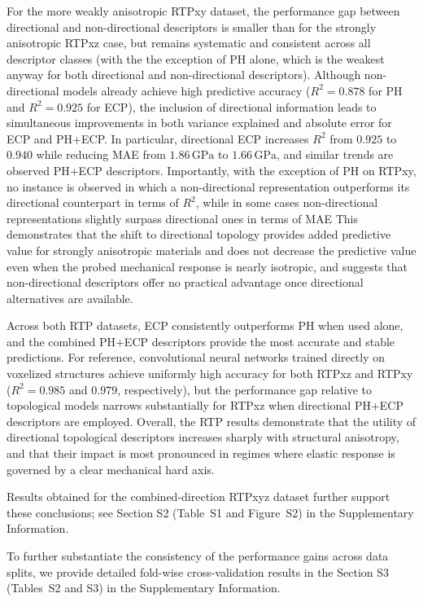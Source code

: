 \documentclass[sn-mathphys,Numbered]{sn-jnl}
\theoremstyle{definition}
\begin{document}
For the more weakly anisotropic RTPxy dataset, the performance gap between
directional and non-directional descriptors is smaller than for the strongly
anisotropic RTPxz case, but remains systematic and consistent across all
descriptor classes (with the the exception of PH alone, which is the weakest anyway for both directional and non-directional descriptors).
Although non-directional models already achieve high predictive accuracy
($R^2=0.878$ for PH and $R^2=0.925$ for ECP), the inclusion of directional
information leads to simultaneous improvements in both variance explained and
absolute error for ECP and PH+ECP.
In particular, directional ECP increases $R^2$ from $0.925$ to $0.940$ while
reducing MAE from $1.86\,\mathrm{GPa}$ to $1.66\,\mathrm{GPa}$, and similar trends are observed PH+ECP descriptors.
Importantly, with the exception of PH on RTPxy, no instance is observed in which a non-directional representation outperforms its directional counterpart in terms of $R^2$, while in some cases non-directional representations slightly surpass directional ones in terms of MAE
This demonstrates that the shift to directional topology provides added predictive value for strongly anisotropic materials and does not decrease the predictive value
even when the probed mechanical response is nearly isotropic, and suggests that
non-directional descriptors offer no practical advantage once directional
alternatives are available.

Across both RTP datasets, ECP consistently outperforms PH when used alone, and
the combined PH+ECP descriptors provide the most accurate and stable predictions.
For reference, convolutional neural networks trained directly on voxelized
structures achieve uniformly high accuracy for both RTPxz and RTPxy
($R^2=0.985$ and $0.979$, respectively), but the performance gap relative to
topological models narrows substantially for RTPxz when directional PH+ECP
descriptors are employed.
Overall, the RTP results demonstrate that the utility of directional topological
descriptors increases sharply with structural anisotropy, and that their impact
is most pronounced in regimes where elastic response is governed by a clear
mechanical hard axis. 

Results obtained for the combined-direction RTPxyz dataset further support these conclusions; see Section S2 (Table~S1 and Figure~S2) in the Supplementary Information.

To further substantiate the consistency of the performance gains across data splits, 
we provide detailed fold-wise cross-validation results in the Section S3 (Tables~S2 and S3) in the Supplementary Information.
\end{document}
